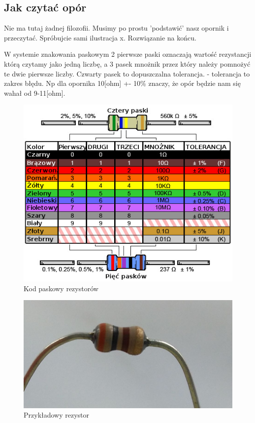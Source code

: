 \documentclass[a4paper,12pt, twoside]{article}
\begin{document}
	\subsection{Jak czytać opór}
Nie ma tutaj żadnej filozofii. Musimy po prostu 'podstawić' nasz opornik i przeczytać. Spróbujcie sami ilustracja x. Rozwiązanie na końcu.

W systemie znakowania paskowym 2 pierwsze paski oznaczają wartość rezystancji którą czytamy jako jedną liczbę, a 3 pasek mnożnik przez który należy pomnożyć te dwie pierwsze liczby.
Czwarty pasek to dopuszczalna tolerancja. - tolerancja to zakres błędu. Np dla opornika 10[ohm] +- 10\% znaczy, że opór będzie nam się wahał od 9-11[ohm].
\begin{figure}
 \centering
  \includegraphics[scale=0.7]{kod_paskowy.jpg}
  \caption{Kod paskowy rezystorów}
  \label{fig:test}
\end{figure}
\begin{figure}
 \centering
  \includegraphics[scale=0.4]{opornik.jpg}
  \caption{Przykładowy rezystor}
  \label{fig:test}
\end{figure}
\FloatBarrier
\end{document}
